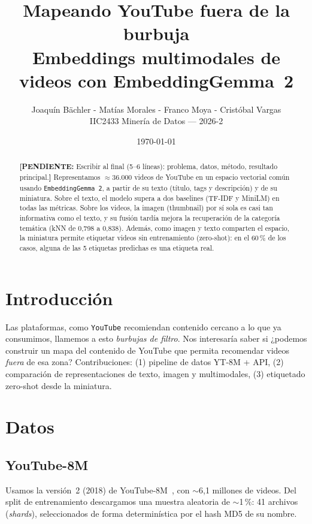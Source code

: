 \documentclass[11pt,a4paper]{article}
\title{\textbf{Mapeando YouTube fuera de la burbuja}\\[4pt]
  \large Embeddings multimodales de videos con EmbeddingGemma~2}
\author{Joaquín Bächler - Matías Morales - Franco Moya - Cristóbal Vargas \\ IIC2433 Minería de Datos — 2026-2}
\date{\today}
\newcommand{\todo}[1]{\textcolor{orange!80!black}{\textbf{[PENDIENTE:} #1\textbf{]}}}
\begin{document}
\maketitle

\begin{abstract}
\todo{Escribir al final (5--6 líneas): problema, datos, método, resultado principal.}
Representamos $\approx 36.000$ videos de YouTube en un espacio vectorial común usando \texttt{EmbeddingGemma~2},
a partir de su texto (título, tags y descripción) y de su miniatura. Sobre el texto, el modelo
supera a dos baselines (TF-IDF y MiniLM) en todas las métricas. Sobre los videos, la imagen (thumbnail) por sí sola es casi tan informativa como el texto, y su fusión tardía mejora la
recuperación de la categoría temática (kNN de 0,798 a 0,838). Además, como imagen y texto
comparten el espacio, la miniatura permite etiquetar videos sin entrenamiento (zero-shot):
en el 60\,\% de los casos, alguna de las 5 etiquetas predichas es una etiqueta real.
\end{abstract}

\section{Introducción}
Las plataformas, como \texttt{YouTube} recomiendan contenido cercano a lo que ya consumimos, llamemos a esto \textit{burbujas de filtro}. Nos interesaría saber si ¿podemos construir un mapa del contenido de YouTube que
permita recomendar videos \emph{fuera} de esa zona? Contribuciones:
(1) pipeline de datos YT-8M + API, (2) comparación de representaciones de texto,
imagen y multimodales, (3) etiquetado zero-shot desde la miniatura.

\section{Datos}

\subsection{YouTube-8M}
Usamos la versión~2 (2018) de YouTube-8M~\cite{yt8m}, con $\sim$6,1 millones de videos.
Del split de entrenamiento descargamos una muestra aleatoria de $\sim$1\,\%: 41 archivos
(\emph{shards}), seleccionados de forma determinística por el hash MD5 de su nombre.
\end{document}
